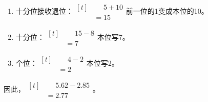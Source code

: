 {\begin{enumerate}[leftmargin=1.7em,itemsep=5pt,topsep=0pt]
\item 十分位接收退位：\(\begin{aligned}[t]&\phantom{={}}5+10\\&=15\end{aligned}\)\quad 前一位的1变成本位的10。
\item 十分位：\(\begin{aligned}[t]&\phantom{={}}15-8\\&=7\end{aligned}\)\quad 本位写7。
\item 个位：\(\begin{aligned}[t]&\phantom{={}}4-2\\&=2\end{aligned}\)\quad 本位写2。
\end{enumerate}
\par\smallskip
因此，\(\begin{aligned}[t]&\phantom{={}}5.62-2.85\\&=2.77\end{aligned}\)。
\par\medskip

}
